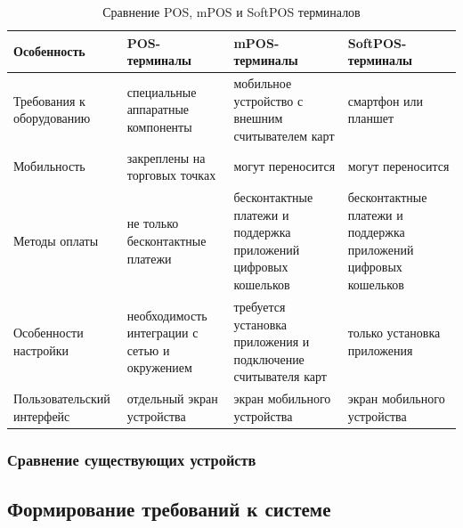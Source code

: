 \begin{table}[H]
    \caption{Сравнение POS, mPOS и SoftPOS терминалов}
    \label{tab:pos_comparison}
    \begin{sloppypar}
        \centering
        \begin{tabularx}{\textwidth}{ | >{\raggedright\arraybackslash}X | >{\raggedright\arraybackslash}X | >{\raggedright\arraybackslash}X | >{\raggedright\arraybackslash}X | }
            \hline
            \textbf{Особенность} & \textbf{POS-терминалы} & \textbf{mPOS-терминалы} & \textbf{SoftPOS-терминалы} \\
            \hline
            Требования к оборудованию & специальные аппаратные компоненты & мобильное устройство с внешним считывателем карт & смартфон или планшет \\
            \hline
            Мобильность & закреплены на торговых точках & могут переносится & могут переносится \\
            \hline
            Методы оплаты & не только бесконтактные платежи & бесконтактные платежи и поддержка приложений цифровых кошельков & бесконтактные платежи и поддержка приложений цифровых кошельков \\
            \hline
            Особенности настройки & необходимость интеграции с сетью и окружением & требуется установка приложения и подключение считывателя карт & только установка приложения \\
            \hline
            Пользовательский интерфейс & отдельный экран устройства & экран мобильного устройства & экран мобильного устройства \\
            \hline
        \end{tabularx}
    \end{sloppypar}
\end{table}


\subsubsection{Сравнение существующих устройств}




\subsection{Формирование требований к системе}


